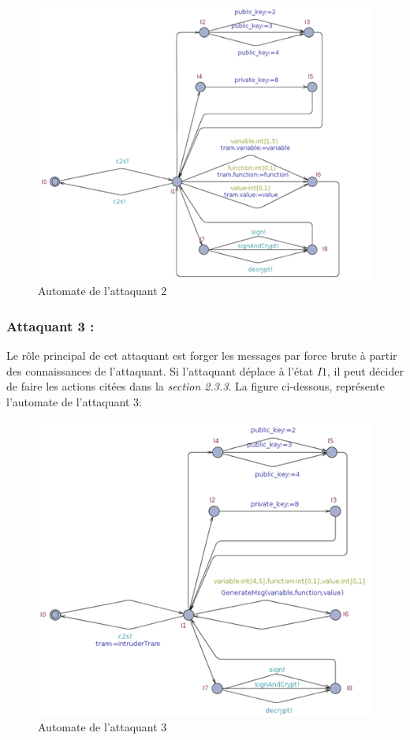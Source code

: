 \documentclass[10pt,a4paper]{article}
\begin{document}
\begin{figure}[!h]
\centering 
\includegraphics[scale=0.5]{img/attaquant2-500.png}
\caption{Automate de l'attaquant 2}
\end{figure}
\newpage
\subsubsection{Attaquant 3 :}
Le rôle principal de cet attaquant est forger les messages par force brute à partir des connaissances de l'attaquant. Si l'attaquant déplace à l'état $I1$, il peut décider de faire les actions citées dans la \textit{section 2.3.3}. La figure ci-dessous, représente l'automate de l'attaquant 3:  

\begin{figure}[!h]
\centering 
\includegraphics[scale=0.5]{img/attaquant3-500.png}
\caption{Automate de l'attaquant 3}
\end{figure}
\end{document}

